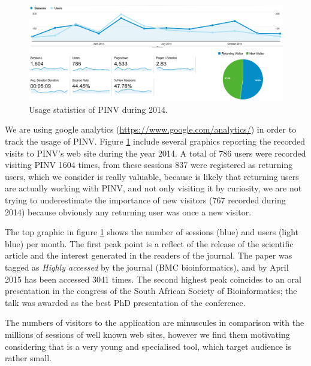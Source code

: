 \begin{figure}
\centering
\includegraphics[width=\textwidth]{figures/google_analytics.png}
\caption[Usage statistics of PINV during 2014]{Usage statistics of PINV during 2014. 
\label{fig:google_analytics}}
\end{figure}

We are using google analytics (\url{https://www.google.com/analytics/}) in order to track the usage of PINV. Figure \ref{fig:google_analytics} include several graphics reporting the recorded visits to PINV's web site during the year 2014. A total of 786 users were recorded visiting PINV 1604 times, from these sessions 837 were registered as returning users, which we consider is really valuable, because is likely that returning users are actually working with PINV, and not only visiting it by curiosity,  we are not trying to underestimate the importance of new visitors (767 recorded during 2014) because obviously any returning user was once a new visitor.

The top graphic in figure \ref{fig:google_analytics} shows the number of sessions (blue) and users (light blue) per month. The first peak point is a reflect of the release of the scientific article and the interest generated in the readers of the journal. The paper was tagged as \emph{Highly accessed} by the journal (BMC bioinformatics), and by April 2015 has been accessed 3041 times. The second highest peak coincides to an oral presentation in the congress of the South African Society of Bioinformatics; the talk was awarded as the best PhD presentation of the conference.

The numbers of visitors to the application are minuscules in comparison with the millions of sessions of well known web sites, however we find them motivating considering that is a very young and specialised tool, which target audience is rather small.

